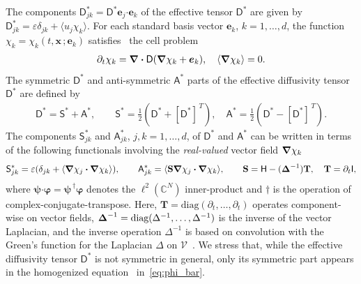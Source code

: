\documentclass[leqno,onefignum,onetabnum]{siamltex1213}
\newcommand{\Tb}{\mathbf{T}}
\newcommand{\Sb}{\mathbf{S}}
\newcommand{\Vc}{\mathcal{V}}
\newcommand{\Dm}{\mathsf{D}}
\newcommand{\Hm}{\mathsf{H}}
\newcommand{\Sm}{\mathsf{S}}
\newcommand{\Am}{\mathsf{A}}
\newcommand{\Ib}{\mathsf{I}}
\newcommand\bDelta{\mbox{\boldmath${\Delta}$}}
\newcommand\bnabla{\mbox{\boldmath${\nabla}$}}
\providecommand\bcdot{\boldsymbol{\cdot}}
\newcommand{\vecx}{\boldsymbol{x}}
\newcommand{\vece}{\boldsymbol{e}}
\newcommand{\vecpsi}{\boldsymbol{\psi}}
\newcommand{\vecvarphi}{\boldsymbol{\varphi}}
\begin{document}
The components $\Dm^*_{jk}=\Dm^*\vece _j\bcdot\vece _k$ of the effective
tensor $\Dm^*$ are given by $\Dm^*_{jk}=\varepsilon\delta_{jk}+\langle u_j\chi_k\rangle$. For each
standard basis vector $\vece _k$, $k=1,\ldots,d$, the function
$\chi_k=\chi_k(t,\vecx\,;\vece _k)$ satisfies~\cite{Fannjiang:1994:SIAM_JAM:333}
the cell problem     
% 
\begin{align}%
  \partial_t\chi_k=\bnabla \bcdot\Dm(\bnabla \chi_k+\vece_k), \quad
  \langle\bnabla \chi_k\rangle=0.
\end{align}
%
 The symmetric $\Dm^*$ and
anti-symmetric $\Am^*$ parts of the effective diffusivity tensor
$\Dm^*$ are defined by 
%
\begin{align}%
  \Dm^*=\Sm^*+\Am^*,\qquad
  \Sm^*=\frac{1}{2}\left(\Dm^*+[\Dm^*]^{\,T}\right), \quad
  \Am^*=\frac{1}{2}\left(\Dm^*-[\Dm^*]^{\,T}\right).
\end{align}
%
The components $\Sm^*_{jk}$ and $\Am^*_{jk}$, $j,k=1,\ldots,d$, of $\Dm^*$
and $\Am^*$ can be written in terms of the following functionals
involving the \emph{real-valued} vector field $\bnabla \chi_k$
%
\begin{align}%
 \Sm^*_{jk}=\varepsilon(\delta_{jk}+\langle\bnabla \chi_j\bcdot\bnabla \chi_k\rangle), \qquad
 \Am^*_{jk}=\langle\Sb\bnabla \chi_j\bcdot\bnabla \chi_k\rangle, \qquad
 \Sb=\Hm-(\bDelta^{-1})\Tb, \quad \Tb=\partial_t\Ib,
\end{align}
%
where $\vecpsi\bcdot\vecvarphi=\vecpsi^{\,\dagger}\vecvarphi$ denotes the
$\ell^2(\mathbb{C}^N)$ inner-product and $\dagger$ is the operation of
complex-conjugate-transpose.  
Here, $\Tb=\text{diag}(\partial_t,\ldots,\partial_t)$ operates component-wise on vector
fields, $\bDelta^{-1}=\text{diag}(\Delta^{-1},\ldots,\Delta^{-1})$ is the inverse of
the vector Laplacian, and the inverse operation $\Delta^{-1}$ is based on
convolution with the Green's function for the Laplacian $\Delta$ on
$\Vc$~\cite{Stakgold:BVP:2000}.  We stress that, while the effective diffusivity tensor $\Dm^*$ is not symmetric in general, only its
symmetric part appears in the homogenized
equation~\cite{McLaughlin:SIAM_JAM:780} in~\eqref{eq:phi_bar}.   
\end{document}
